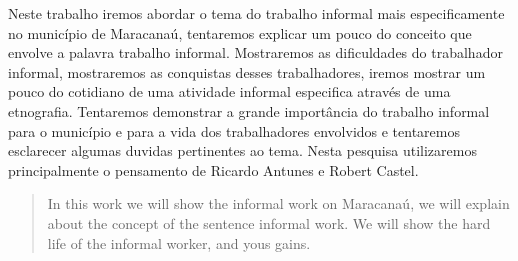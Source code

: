 \begin{resumo}
Neste trabalho iremos abordar o tema do trabalho informal mais especificamente 
no município de Maracanaú, tentaremos explicar um pouco do conceito que envolve 
a palavra trabalho informal. Mostraremos as dificuldades do trabalhador 
informal, mostraremos as conquistas desses trabalhadores, iremos mostrar um 
pouco do cotidiano de uma atividade informal especifica através de uma 
etnografia. Tentaremos demonstrar a grande importância do trabalho informal para 
o município e para a vida dos trabalhadores envolvidos e tentaremos esclarecer 
algumas duvidas pertinentes ao tema. Nesta pesquisa utilizaremos principalmente 
o pensamento de Ricardo Antunes e Robert Castel. 

\palavraschave
\end{resumo}
\pagebreak

\begin{abstract}
In this work we will show the informal work on Maracanaú, we will explain about 
the concept of the sentence informal work. We will show the hard life of the informal worker, and yous gains.

\keywords
\end{abstract}
